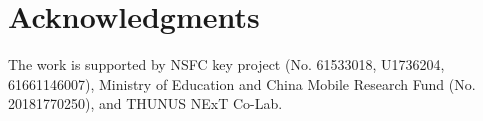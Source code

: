 \documentclass[11pt,a4paper]{article}
\begin{document}
  \section*{Acknowledgments}
  
  The work is supported by NSFC key project (No. 61533018, U1736204, 61661146007), Ministry of Education and China Mobile Research Fund (No. 20181770250), and THUNUS NExT Co-Lab.
  
  
  
  
  \appendix
  
  
\end{document}
